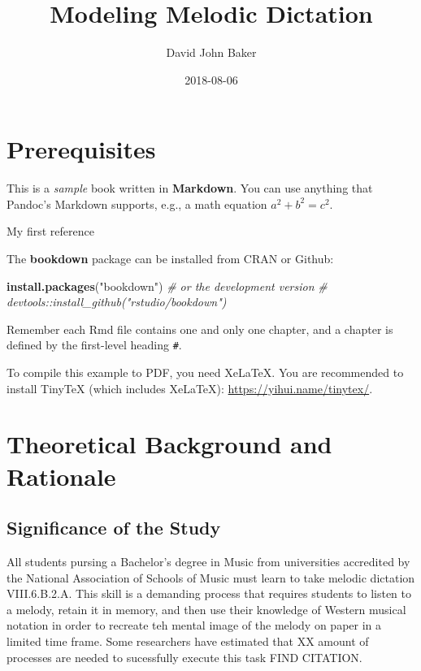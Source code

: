 \documentclass[]{book}
\title{Modeling Melodic Dictation}
\author{David John Baker}
\date{2018-08-06}
\newenvironment{Shaded}{\begin{snugshade}}{\end{snugshade}}
\newcommand{\CommentTok}[1]{\textcolor[rgb]{0.56,0.35,0.01}{\textit{#1}}}
\newcommand{\KeywordTok}[1]{\textcolor[rgb]{0.13,0.29,0.53}{\textbf{#1}}}
\newcommand{\NormalTok}[1]{#1}
\newcommand{\StringTok}[1]{\textcolor[rgb]{0.31,0.60,0.02}{#1}}
\theoremstyle{definition}
\theoremstyle{definition}
\theoremstyle{definition}
\theoremstyle{remark}
\begin{document}
\maketitle

{
\setcounter{tocdepth}{1}
\tableofcontents
}
\hypertarget{prerequisites}{%
\chapter{Prerequisites}\label{prerequisites}}

This is a \emph{sample} book written in \textbf{Markdown}. You can use
anything that Pandoc's Markdown supports, e.g., a math equation
\(a^2 + b^2 = c^2\).

My first reference \citep{margulisModelMelodicExpectation2005}

The \textbf{bookdown} package can be installed from CRAN or Github:

\begin{Shaded}
\begin{Highlighting}[]
\KeywordTok{install.packages}\NormalTok{(}\StringTok{"bookdown"}\NormalTok{)}
\CommentTok{# or the development version}
\CommentTok{# devtools::install_github("rstudio/bookdown")}
\end{Highlighting}
\end{Shaded}

Remember each Rmd file contains one and only one chapter, and a chapter
is defined by the first-level heading \texttt{\#}.

To compile this example to PDF, you need XeLaTeX. You are recommended to
install TinyTeX (which includes XeLaTeX):
\url{https://yihui.name/tinytex/}.

\hypertarget{intro}{%
\chapter{Theoretical Background and Rationale}\label{intro}}

\hypertarget{significance-of-the-study}{%
\section{Significance of the Study}\label{significance-of-the-study}}

All students pursing a Bachelor's degree in Music from universities
accredited by the National Association of Schools of Music must learn to
take melodic dictation \citep{NASM201718HandbookPdf2018} VIII.6.B.2.A.
This skill is a demanding process that requires students to listen to a
melody, retain it in memory, and then use their knowledge of Western
musical notation in order to recreate teh mental image of the melody on
paper in a limited time frame. Some researchers have estimated that XX
amount of processes are needed to sucessfully execute this task FIND
CITATION.
\end{document}
